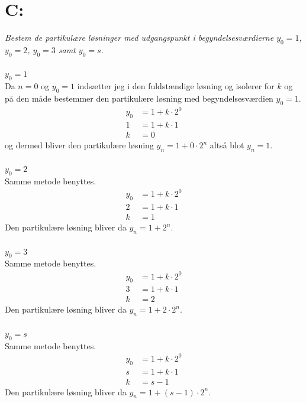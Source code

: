 \documentclass[a4paper, 11pt]{article}
\begin{document}
\section*{C:}
\textit{Bestem de partikulære løsninger med udgangspunkt i begyndelsesværdierne \(y_0=1\), \(y_0=2\), \(y_0=3\) samt \(y_0=s\).}\\\\
\underline{\(y_0=1\)}\\
Da \(n=0\) og \(y_0=1\) indsætter jeg i den fuldstændige løsning og isolerer for \(k\) og på den måde bestemmer den partikulære løsning med begyndelsesværdien \(y_0=1\).
\begin{align*}
    y_{0}&=1+k \cdot 2^0\\
    1&=1+k \cdot 1\\
    k&=0
\end{align*}
og dermed bliver den partikulære løsning \(y_n=1+0\cdot 2^n\) altså blot \(y_n=1\).\\\\
\underline{\(y_0=2\)}\\
Samme metode benyttes.
\begin{align*}
    y_{0}&=1+k \cdot 2^0\\
    2&=1+k \cdot 1\\
    k&=1
\end{align*}
Den partikulære løsning bliver da \(y_n=1+2^n\).\\\\
\underline{\(y_0=3\)}\\
Samme metode benyttes.
\begin{align*}
    y_{0}&=1+k \cdot 2^0\\
    3&=1+k\cdot 1\\
    k&=2
\end{align*}
Den partikulære løsning bliver da \(y_n=1+2 \cdot 2^n\).\\\\
\underline{\(y_0=s\)}\\
Samme metode benyttes.
\begin{align*}
    y_{0}&=1+k \cdot 2^0\\
    s&=1+k\cdot 1\\
    k&=s-1
\end{align*}
Den partikulære løsning bliver da \(y_n=1+(s-1) \cdot 2^n\).
\clearpage
\end{document}
